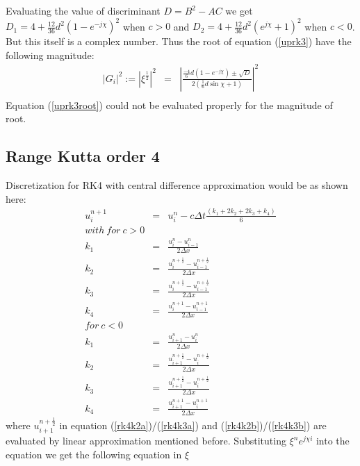 \documentclass[a4paper,12pt]{report}
\begin{document}
Evaluating the value of discriminant $D = B^2 - AC$ we get $D_1 = 4 + \frac{12}{36}d^2(1-e^{-j\chi})^2$ when $c>0$
and $D_2 = 4 + \frac{12}{36}d^2(e^{j\chi}+1)^2$ when $c<0$.
But this itself is a complex number. Thus the root of equation (\ref{uprk3}) have the following magnitude:
\begin{eqnarray}
|G_i|^2 := |\xi^\frac{1}{2}|^2 &=& |\frac{\frac{-4}{6}d(1-e^{-j\chi})\pm \sqrt{D}}{2(\frac{1}{6}d\sin{\chi}+1)}|^2 \label{uprk3root}\\
\end{eqnarray}
Equation (\ref{uprk3root}) could not be evaluated properly for the magnitude of root.
\subsection{Range Kutta order 4}
Discretization for RK4 with central difference approximation would be as shown here:
\begin{eqnarray}
u^{n+1}_{i} &=& u^{n}_{i} - c\Delta t \frac{(k_1+2k_2+2k_3+k_4)}{6}
\\with\ for\ c>0 \nonumber\\
k_1 &=& \frac{u_{i}^{n} -u_{i-1}^{n}}{2\Delta x} \nonumber \\
k_2 &=& \frac{u_{i}^{n+\frac{1}{2}} -u_{i-1}^{n+\frac{1}{2}}}{2\Delta x} \label{rk4k2a}\\
k_3 &=& \frac{u_{i}^{n+\frac{1}{2}} -u_{i-1}^{n+\frac{1}{2}}}{2\Delta x} \label{rk4k3a}\\
k_4 &=& \frac{u_{i}^{n+1} -u_{i-1}^{n+1}}{2\Delta x} \nonumber\\
for\ c<0 \nonumber \\
k_1 &=& \frac{u_{i+1}^{n} -u_{i}^{n}}{2\Delta x} \nonumber \\
k_2 &=& \frac{u_{i+1}^{n+\frac{1}{2}} -u_{i}^{n+\frac{1}{2}}}{2\Delta x} \label{rk4k2b}\\
k_3 &=& \frac{u_{i+1}^{n+\frac{1}{2}} -u_{i}^{n+\frac{1}{2}}}{2\Delta x} \label{rk4k3b}\\
k_4 &=& \frac{u_{i+1}^{n+1} -u_{i}^{n+1}}{2\Delta x} \nonumber
\end{eqnarray}
where $u_{i+1}^{n+\frac{1}{2}}$ in equation (\ref{rk4k2a})/(\ref{rk4k3a}) and (\ref{rk4k2b})/(\ref{rk4k3b}) are evaluated by linear approximation mentioned before.
Substituting $\xi^{n}e^{j\chi i}$ into the equation we get the following equation in $\xi$
\end{document}
